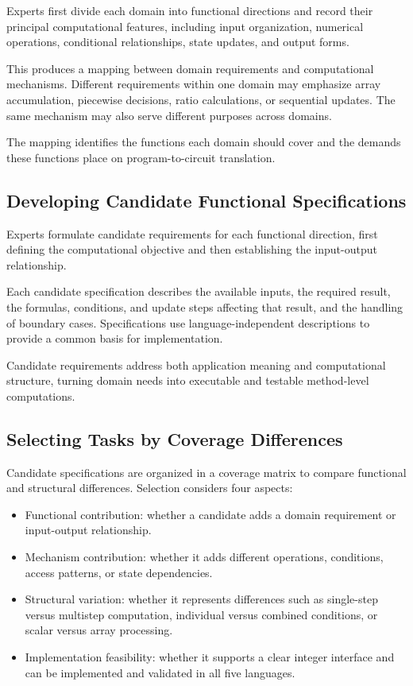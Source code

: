 \documentclass[11pt,a4paper]{article}
\begin{document}
Experts first divide each domain into functional directions and record their principal computational features, including input organization, numerical operations, conditional relationships, state updates, and output forms.

This produces a mapping between domain requirements and computational mechanisms. Different requirements within one domain may emphasize array accumulation, piecewise decisions, ratio calculations, or sequential updates. The same mechanism may also serve different purposes across domains.

The mapping identifies the functions each domain should cover and the demands these functions place on program-to-circuit translation.

\subsection{Developing Candidate Functional Specifications}

Experts formulate candidate requirements for each functional direction, first defining the computational objective and then establishing the input-output relationship.

Each candidate specification describes the available inputs, the required result, the formulas, conditions, and update steps affecting that result, and the handling of boundary cases. Specifications use language-independent descriptions to provide a common basis for implementation.

Candidate requirements address both application meaning and computational structure, turning domain needs into executable and testable method-level computations.

\subsection{Selecting Tasks by Coverage Differences}

Candidate specifications are organized in a coverage matrix to compare functional and structural differences. Selection considers four aspects:

\begin{samepage}
\begin{itemize}
\item Functional contribution: whether a candidate adds a domain requirement or input-output relationship.
\item Mechanism contribution: whether it adds different operations, conditions, access patterns, or state dependencies.
\item Structural variation: whether it represents differences such as single-step versus multistep computation, individual versus combined conditions, or scalar versus array processing.
\item Implementation feasibility: whether it supports a clear integer interface and can be implemented and validated in all five languages.
\end{itemize}
\end{samepage}
\end{document}

